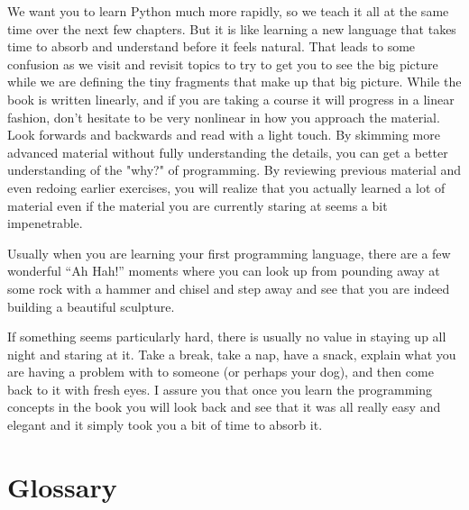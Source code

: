 We want you to learn Python much more rapidly, so we teach it all at the same time over the next few chapters. But it is like learning a new language that takes time to absorb and understand before it feels natural. That leads to some confusion as we visit and revisit topics to try to get you to see the big picture while we are defining the tiny fragments that make up that big picture. While the book is written linearly, and if you are taking a course it will progress in a linear fashion, don't hesitate to be very nonlinear in how you approach the material. Look forwards and backwards and read with a light touch. By skimming more advanced material without fully understanding the details, you can get a better understanding of the "why?" of programming. By reviewing previous material and even redoing earlier exercises, you will realize that you actually learned a lot of material even if the material you are currently staring at seems a bit impenetrable.

Usually when you are learning your first programming language, there are a few wonderful ``Ah Hah!'' moments where you can look up from pounding away at some rock with a hammer and chisel and step away and see that you are indeed building a beautiful sculpture.

If something seems particularly hard, there is usually no value in staying up all night and staring at it. Take a break, take a nap, have a snack, explain what you are having a problem with to someone (or perhaps your dog), and then come back to it with fresh eyes. I assure you that once you learn the programming concepts in the book you will look back and see that it was all really easy and elegant and it simply took you a bit of time to absorb it.

\hypertarget{glosario}{%
\section{Glossary}\label{glosario}}


